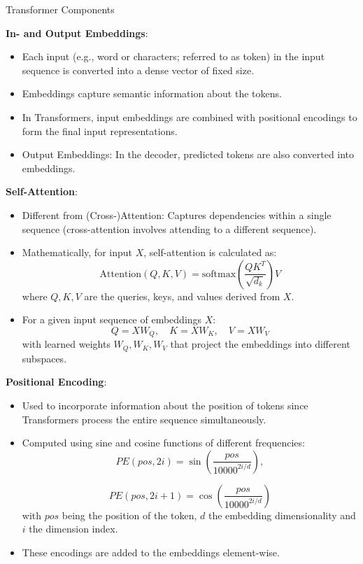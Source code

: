 \documentclass[11pt,compress,t,notes=noshow, xcolor=table]{beamer}
\begin{document}
\begin{vbframe}{Transformer Components}

\textbf{In- and Output Embeddings}:
  \begin{itemize}
  \item Each input (e.g., word or characters; referred to as token) in the input sequence is converted into a dense vector of fixed size.
  \item Embeddings capture semantic information about the tokens.
  \item In Transformers, input embeddings are combined with positional encodings to form the final input representations.
  \item Output Embeddings: In the decoder, predicted tokens are also converted into embeddings.
  \end{itemize}

\framebreak

\textbf{Self-Attention}:
  \begin{itemize}
    \item Different from (Cross-)Attention: Captures dependencies within a single sequence (cross-attention involves attending to a different sequence).
    \item Mathematically, for input \( X \), self-attention is calculated as:
        \[
        \text{Attention}(Q, K, V) = \text{softmax}\left(\frac{QK^T}{\sqrt{d_k}}\right) V
        \]
      where \( Q, K, V \) are the queries, keys, and values derived from \( X \).
    \item For a given input sequence of embeddings \( X \):
        \[
        Q = XW_Q, \quad K = XW_K, \quad V = XW_V
        \]
      with learned weights \( W_Q, W_K, W_V \) that project the embeddings into different subspaces.
  \end{itemize}
  
  
\framebreak
  
  \textbf{Positional Encoding}:
  \begin{itemize}
    \item Used to incorporate information about the position of tokens since Transformers process the entire sequence simultaneously.
    \item Computed using sine and cosine functions of different frequencies:
        \[
        PE(pos, 2i) = \sin\left(\frac{pos}{10000^{2i/d}}\right), 
        \]
        
        \[
        PE(pos, 2i+1) = \cos\left(\frac{pos}{10000^{2i/d}}\right)
        \]
     with \( pos \) being the position of the token, \( d \) the embedding dimensionality and \( i \) the dimension index.
     \item These encodings are added to the embeddings element-wise.
  \end{itemize}


\end{vbframe}
\end{document}
